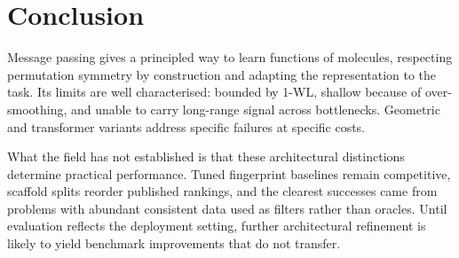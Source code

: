 \documentclass[11pt,a4paper]{article}
\begin{document}
\section{Conclusion}
\label{sec:conclusion}

Message passing gives a principled way to learn functions of molecules,
respecting permutation symmetry by construction and adapting the
representation to the task. Its limits are well characterised: bounded by
1-WL, shallow because of over-smoothing, and unable to carry long-range signal
across bottlenecks. Geometric and transformer variants address specific
failures at specific costs.

What the field has not established is that these architectural distinctions
determine practical performance. Tuned fingerprint baselines remain
competitive, scaffold splits reorder published rankings, and the clearest
successes came from problems with abundant consistent data used as filters
rather than oracles. Until evaluation reflects the deployment setting, further
architectural refinement is likely to yield benchmark improvements that do not
transfer.
\end{document}
